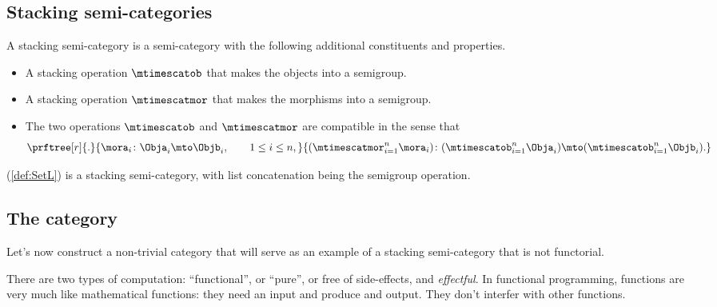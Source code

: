 \subsection{Stacking semi-categories}

\begin{ctdefinition}
    \label{def:stacking-semi-cat}
    A stacking semi-category is a semi-category with the following additional constituents and properties.

    \constit
    \begin{itemize}
        \item A stacking operation $\mtimescatob$ that makes the objects into a semigroup.
        \item A stacking operation $\mtimescatmor$ that makes the morphisms into a semigroup.
    \end{itemize}

    \condit
    \begin{itemize}
        \item The two operations $\mtimescatob$ and $\mtimescatmor$ are compatible in the sense that
              \begin{equation}
                  \prftree[r]{.}{
                      \mora_i \colon \Obja_i \mto \Objb_i, \qquad 1 \leq i \leq n,
                  }{
                      ( \mtimescatmor_{i=1}^n \mora_i )\colon( \mtimescatob_{i=1}^n \Obja_i) \mto (\mtimescatob_{i=1}^n \Objb_i).
                  }
              \end{equation}
    \end{itemize}
\end{ctdefinition}

\begin{example}
    \SetStar (\cref{def:SetL}) is a stacking semi-category,
    with list concatenation being the semigroup operation.
\end{example}

\subsection{The \Effects category}

Let's now construct a non-trivial category that will serve as an example of a stacking semi-category that is not functorial.

There are two types of computation: ``functional'', or ``pure'', or free of side-effects, and \emph{effectful}.
In functional programming, functions are very much like mathematical functions: they need an input and produce and output.
They don't interfer with other functions.

